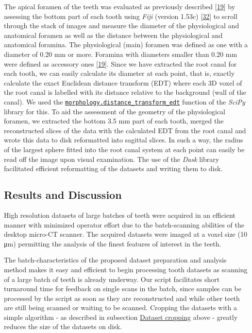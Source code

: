 \documentclass[
  american,
]{article}
\begin{document}
The apical foramen of the teeth was evaluated as previously described {[}\protect\hyperlink{ref-1Gn1pVZXt}{19}{]} by assessing the bottom part of each tooth using \emph{Fiji} (version 1.53c) {[}\protect\hyperlink{ref-Fkmz2cmo}{32}{]} to scroll through the stack of images and measure the diameter of the physiological and anatomical foramen as well as the distance between the physiological and anatomical foramina.
The physiological (main) foramen was defined as one with a diameter of 0.20 mm or more.
Foramina with diameters smaller than 0.20 mm were defined as accessory ones {[}\protect\hyperlink{ref-1Gn1pVZXt}{19}{]}.
Since we have extracted the root canal for each tooth, we can easily calculate its diameter at each point, that is, exactly calculate the exact Euclidean distance transform (EDT) where each 3D voxel of the root canal is labelled with its distance relative to the background (wall of the canal).
We used the \href{https://docs.scipy.org/doc/scipy-0.14.0/reference/generated/scipy.ndimage.morphology.distance_transform_edt.html}{\texttt{morphology.distance\_transform\_edt}} function of the \emph{SciPy} library for this.
To aid the assessment of the geometry of the physiological foramen, we extracted the bottom 3.5 mm part of each tooth, merged the reconstructed slices of the data with the calculated EDT from the root canal and wrote this data to disk reformatted into sagittal
slices.
In such a way, the radius of the largest sphere fitted into the root canal system at each point can easily be read off the image upon visual examination.
The use of the \emph{Dask} library facilitated efficient reformatting of the datasets and writing them to disk.

\hypertarget{results-and-discussion}{%
\subsection{Results and Discussion}\label{results-and-discussion}}

High resolution datasets of large batches of teeth were acquired in an efficient manner with minimized operator effort due to the batch-scanning abilities of the desktop micro-CT scanner.
The acquired datasets were imaged at a voxel size (10 μm) permitting the analysis of the finest features of interest in the teeth.

The batch-characteristics of the proposed dataset preparation and analysis method makes it easy and efficient to begin processing tooth datasets as scanning of a large batch of teeth is already underway.
Our script facilitates short turnaround time for feedback on single scans in the batch, since samples can be processed by the script as soon as they are reconstructed and while other teeth are still being scanned or waiting to be scanned.
Cropping the datasets with a simple algorithm - as described in subsection \protect\hyperlink{dataset-cropping}{Dataset cropping} above - greatly reduces the size of the datasets on disk.
\end{document}
